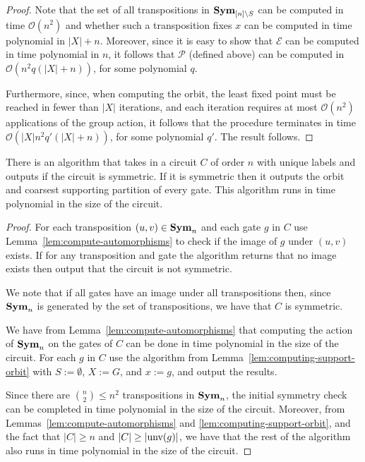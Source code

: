 \documentclass[../paper.tex]{subfiles}
\begin{document}
\begin{proof}
  Note that the set of all transpositions in $\text{\textbf{Sym}}_{[n] \setminus S}$ can be
  computed in time $\mathcal{O}(n^{2})$ and whether such a transposition fixes
  $x$ can be computed in time polynomial in $\vert X \vert + n$. Moreover, since
  it is easy to show that $\mathcal{E}$ can be computed in time polynomial in
  $n$, it follows that $\mathcal{P}$ (defined above) can be computed in
  $\mathcal{O} (n^{2} q(\vert X \vert + n))$, for some polynomial $q$.

  Furthermore, since, when computing the orbit, the least fixed point must be
  reached in fewer than $\vert X \vert$ iterations, and each iteration requires
  at most $\mathcal{O} (n^{2})$ applications of the group action, it follows
  that the procedure terminates in time $\mathcal{O}(\vert X \vert n^{2} q'
  (\vert X \vert + n))$, for some polynomial $q'$. The result follows.
\end{proof}

\begin{lem}
  There is an algorithm that takes in a circuit $C$ of order $n$ with unique
  labels and outputs if the circuit is symmetric. If it is symmetric then it
  outputs the orbit and coarsest supporting partition of every gate. This
  algorithm runs in time polynomial in the size of the circuit.
  \label{lem:computing-support-orbit-gate}
\end{lem}

\begin{proof}
  For each transposition $(u,v) \in \text{\textbf{Sym}}_n$ and each gate $g$ in $C$ use
  Lemma~\ref{lem:compute-automorphisms} to check if the image of $g$ under
  $(u,v)$ exists. If for any transposition and gate the algorithm returns that
  no image exists then output that the circuit is not symmetric.

  We note that if all gates have an image under all transpositions then, since
  $\text{\textbf{Sym}}_n$ is generated by the set of transpositions, we have that $C$ is
  symmetric.
  
  We have from Lemma~\ref{lem:compute-automorphisms} that computing the action
  of $\text{\textbf{Sym}}_n$ on the gates of $C$ can be done in time polynomial in the size of
  the circuit. For each $g$ in $C$ use the algorithm from
  Lemma~\ref{lem:computing-support-orbit} with $S := \emptyset$, $X := G$, and
  $x := g$, and output the results.
  
  Since there are ${{n}\choose{2}} \leq n^2$ transpositions in $\text{\textbf{Sym}}_n$, the
  initial symmetry check can be completed in time polynomial in the size of the
  circuit. Moreover, from Lemmas~\ref{lem:compute-automorphisms} and
  \ref{lem:computing-support-orbit}, and the fact that $\vert C \vert \geq n$
  and $\vert C \vert \geq \vert \text{unv}(g) \vert$, we have that the rest of
  the algorithm also runs in time polynomial in the size of the circuit.
\end{proof}
\end{document}
